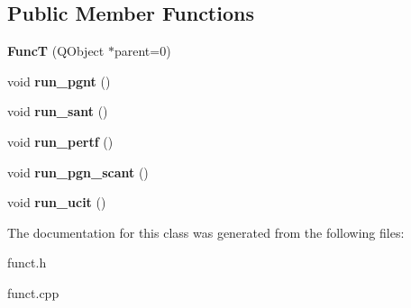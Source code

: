 \subsection*{Public Member Functions}
\begin{DoxyCompactItemize}
\item 
\hypertarget{classchess_1_1FuncT_a46095d8ecf17a52d350f20a8c0870304}{{\bfseries Func\-T} (Q\-Object $\ast$parent=0)}\label{classchess_1_1FuncT_a46095d8ecf17a52d350f20a8c0870304}

\item 
\hypertarget{classchess_1_1FuncT_a692a5fac8edc90ec114ceff4c1a3671d}{void {\bfseries run\-\_\-pgnt} ()}\label{classchess_1_1FuncT_a692a5fac8edc90ec114ceff4c1a3671d}

\item 
\hypertarget{classchess_1_1FuncT_a4b403881f0ac946209b25946e2fcb530}{void {\bfseries run\-\_\-sant} ()}\label{classchess_1_1FuncT_a4b403881f0ac946209b25946e2fcb530}

\item 
\hypertarget{classchess_1_1FuncT_aeee31af9d7148fc54f799d2a79846c8f}{void {\bfseries run\-\_\-pertf} ()}\label{classchess_1_1FuncT_aeee31af9d7148fc54f799d2a79846c8f}

\item 
\hypertarget{classchess_1_1FuncT_aa2aa0cceb2dee0ec37c67fac47b2d79c}{void {\bfseries run\-\_\-pgn\-\_\-scant} ()}\label{classchess_1_1FuncT_aa2aa0cceb2dee0ec37c67fac47b2d79c}

\item 
\hypertarget{classchess_1_1FuncT_aa56f686abbb5b84c1c34ecbe7bf0cbda}{void {\bfseries run\-\_\-ucit} ()}\label{classchess_1_1FuncT_aa56f686abbb5b84c1c34ecbe7bf0cbda}

\end{DoxyCompactItemize}


The documentation for this class was generated from the following files\-:\begin{DoxyCompactItemize}
\item 
funct.\-h\item 
funct.\-cpp\end{DoxyCompactItemize}

